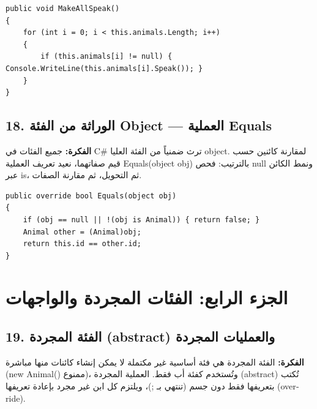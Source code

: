 \documentclass[14pt]{extarticle}
\begin{document}
\begin{boxCode}
\begin{english}
\begin{verbatim}
public void MakeAllSpeak()
{
    for (int i = 0; i < this.animals.Length; i++)
    {
        if (this.animals[i] != null) { Console.WriteLine(this.animals[i].Speak()); }
    }
}
\end{verbatim}
\end{english}
\end{boxCode}

\filbreak
\subsection*{18. الوراثة من الفئة \textenglish{Object} — العملية \textenglish{Equals}}
\textbf{الفكرة:} جميع الفئات في \textenglish{C\#} ترث ضمنياً من الفئة العليا \textenglish{object}. لمقارنة كائنين حسب قيم صفاتهما، نعيد تعريف العملية \textenglish{Equals(object obj)} بالترتيب: فحص \textenglish{null} ونمط الكائن عبر \textenglish{is}، ثم التحويل، ثم مقارنة الصفات.

\begin{boxCode}
\begin{english}
\begin{verbatim}
public override bool Equals(object obj)
{
    if (obj == null || !(obj is Animal)) { return false; }
    Animal other = (Animal)obj;
    return this.id == other.id;
}
\end{verbatim}
\end{english}
\end{boxCode}

\filbreak
\section*{الجزء الرابع: الفئات المجردة والواجهات}

\subsection*{19. الفئة المجردة (\textenglish{abstract}) والعمليات المجردة}
\textbf{الفكرة:} الفئة المجردة هي فئة أساسية غير مكتملة لا يمكن إنشاء كائنات منها مباشرة (\textenglish{new Animal()} ممنوع)، وتُستخدم كفئة أب فقط. العملية المجردة (\textenglish{abstract}) تُكتب بتعريفها فقط دون جسم (تنتهي بـ \textenglish{;})، ويلتزم كل ابن غير مجرد بإعادة تعريفها (\textenglish{override}).
\end{document}
